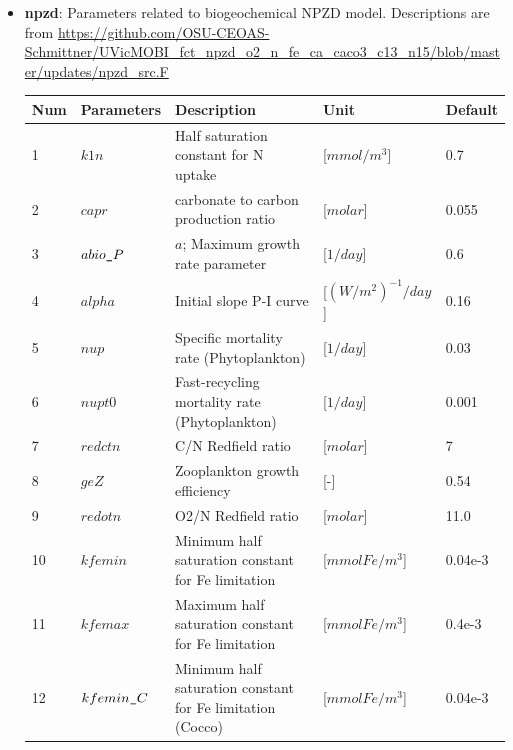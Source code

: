 \documentclass[a4paper]{article}
\begin{document}
\begin{itemize}
\item \textbf{npzd}: Parameters related to biogeochemical NPZD model. Descriptions are from \url{https://github.com/OSU-CEOAS-Schmittner/UVicMOBI_fct_npzd_o2_n_fe_ca_caco3_c13_n15/blob/master/updates/npzd_src.F}

{\footnotesize
\begin{longtable}{lllll} \hline
  Num  & Parameters         & Description                                                 & Unit                          & Default    \\ \hline 
   1   & $k1n$              & Half saturation constant for N uptake                       & [$mmol/m^3$]                  & 0.7        \\
   2   & $capr$             & carbonate to carbon production ratio                        & [$molar$]                     & 0.055      \\
   3   & $abio\verb|_|P$    & $a$; Maximum growth rate parameter                          & [$1/day$]                     & 0.6         \\
   4   & $alpha$            & Initial slope P-I curve                                     & [$(W/m^2)^{-1}/day$]          & 0.16        \\
   5   & $nup$              & Specific mortality rate (Phytoplankton)                     & [$1/day$]                     & 0.03        \\
   6   & $nupt0$            & Fast-recycling  mortality rate (Phytoplankton)              & [$1/day$]                     & 0.001       \\
   7   & $redctn$           & C/N Redfield ratio                                          & [$molar$]                     & 7           \\
   8   & $geZ$              & Zooplankton growth efficiency                               & [-]                           & 0.54        \\
   9   & $redotn$           & O2/N Redfield ratio                                         & [$molar$]                     & 11.0        \\
   10  & $kfemin$           & Minimum half saturation constant for Fe limitation          & [$mmol Fe / m^3$]             & 0.04e-3     \\
   11  & $kfemax$           & Maximum half saturation constant for Fe limitation          & [$mmol Fe / m^3$]             & 0.4e-3     \\
   12  & $kfemin\verb|_|C$  & Minimum half saturation constant for Fe limitation (Cocco)  & [$mmol Fe / m^3$]             & 0.04e-3     \\

\end{longtable}}
\end{itemize}
\end{document}
